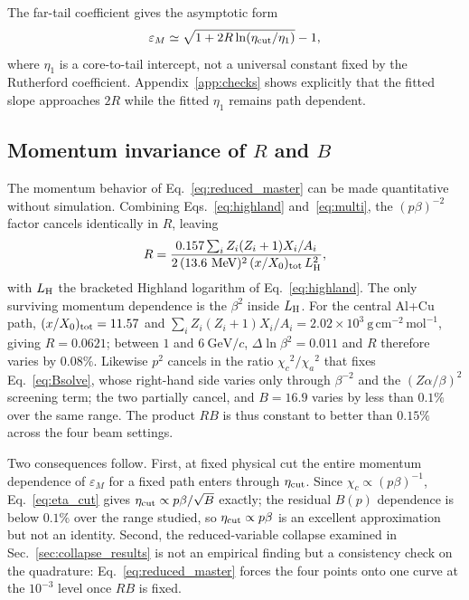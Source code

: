 \documentclass[aps,pra,reprint,longbibliography,floatfix]{revtex4-2}
\newcommand{\epsM}{\ensuremath{\varepsilon_M}}
\newcommand{\XZero}{\ensuremath{X_0}}
\newcommand{\chic}{\ensuremath{\chi_c}}
\newcommand{\chia}{\ensuremath{\chi_a}}
\begin{document}
The far-tail coefficient gives the asymptotic form
\begin{equation}\label{eq:eta1_asymptote}
\epsM\simeq\sqrt{1+2R\ln(\eta_{\rm cut}/\eta_1)}-1,
\end{equation}
where $\eta_1$ is a core-to-tail intercept, not a universal constant fixed by the Rutherford coefficient.  Appendix~\ref{app:checks} shows explicitly that the fitted slope approaches $2R$ while the fitted $\eta_1$ remains path dependent.

\subsection{Momentum invariance of $R$ and $B$}\label{sec:RBinvariance}
The momentum behavior of Eq.~\eqref{eq:reduced_master} can be made quantitative without simulation.  Combining Eqs.~\eqref{eq:highland} and~\eqref{eq:multi}, the $(p\beta)^{-2}$ factor cancels identically in $R$, leaving
\begin{equation}\label{eq:R_explicit}
R=\frac{0.157\sum_i Z_i(Z_i+1)X_i/A_i}
{2\,(13.6~\mathrm{MeV})^2\,(x/\XZero)_{\rm tot}\,L_{\rm H}^2},
\end{equation}
with $L_{\rm H}$ the bracketed Highland logarithm of Eq.~\eqref{eq:highland}.  The only surviving momentum dependence is the $\beta^2$ inside $L_{\rm H}$.  For the central Al+Cu path, $(x/\XZero)_{\rm tot}=11.57$ and $\sum_i Z_i(Z_i+1)X_i/A_i=2.02\times10^{3}~\mathrm{g\,cm^{-2}\,mol^{-1}}$, giving $R=0.0621$; between $1$ and $6~\mathrm{GeV}/c$, $\Delta\ln\beta^2=0.011$ and $R$ therefore varies by $0.08\%$.  Likewise $p^2$ cancels in the ratio $\chic^2/\chia^2$ that fixes Eq.~\eqref{eq:Bsolve}, whose right-hand side varies only through $\beta^{-2}$ and the $(Z\alpha/\beta)^2$ screening term; the two partially cancel, and $B=16.9$ varies by less than $0.1\%$ over the same range.  The product $RB$ is thus constant to better than $0.15\%$ across the four beam settings.

Two consequences follow.  First, at fixed physical cut the entire momentum dependence of $\epsM$ for a fixed path enters through $\eta_{\rm cut}$.  Since $\chic\propto(p\beta)^{-1}$, Eq.~\eqref{eq:eta_cut} gives $\eta_{\rm cut}\propto p\beta/\sqrt{B}$ exactly; the residual $B(p)$ dependence is below $0.1\%$ over the range studied, so $\eta_{\rm cut}\propto p\beta$ is an excellent approximation but not an identity.  Second, the reduced-variable collapse examined in Sec.~\ref{sec:collapse_results} is not an empirical finding but a consistency check on the quadrature: Eq.~\eqref{eq:reduced_master} forces the four points onto one curve at the $10^{-3}$ level once $RB$ is fixed.
\end{document}
